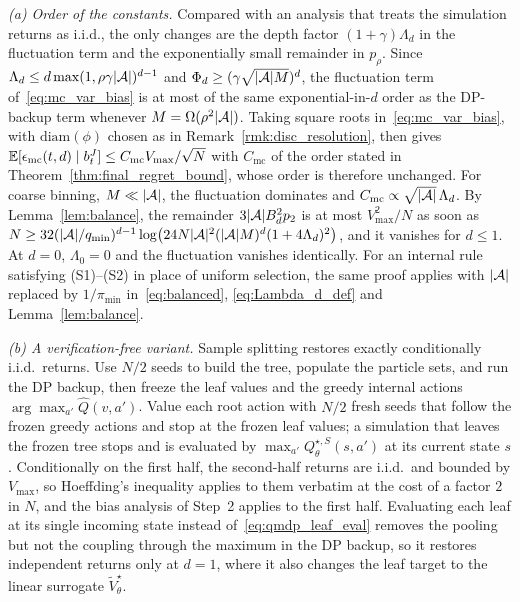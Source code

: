 \begin{rmk}\label{rmk:mc_constants}
\emph{(a) Order of the constants.}
Compared with an analysis that treats the simulation returns as i.i.d., the only changes are the depth factor $(1+\gamma)\Lambda_d$ in the fluctuation term and the exponentially small remainder in $p_\rho$.
Since $\Lambda_d\le d\max(1,\rho\gamma|{\mathcal{A}}|)^{d-1}$ and $\Phi_d\ge(\gamma\sqrt{|{\mathcal{A}}|M})^d$, the fluctuation term of~\eqref{eq:mc_var_bias} is at most of the same exponential-in-$d$ order as the DP-backup term whenever $M=\Omega(\rho^2|{\mathcal{A}}|)$.
Taking square roots in~\eqref{eq:mc_var_bias}, with $\mathrm{diam}(\phi)$ chosen as in Remark~\ref{rmk:disc_resolution}, then gives $\mathbb{E}[\epsilon_{\mathrm{mc}}(t,d)\mid b_t^J]\le C_{\mathrm{mc}}V_{\max}/\sqrt N$ with $C_{\mathrm{mc}}$ of the order stated in Theorem~\ref{thm:final_regret_bound}, whose order is therefore unchanged.
For coarse binning, $M\ll|{\mathcal{A}}|$, the fluctuation dominates and $C_{\mathrm{mc}}\propto\sqrt{|{\mathcal{A}}|}\,\Lambda_d$.
By Lemma~\ref{lem:balance}, the remainder $3|{\mathcal{A}}|B_d^2p_2$ is at most $V_{\max}^2/N$ as soon as $N\ge32(|{\mathcal{A}}|/q_{\min})^{d-1}\log\bigl(24N|{\mathcal{A}}|^2(|{\mathcal{A}}|M)^d(1+4\Lambda_d)^2\bigr)$, and it vanishes for $d\le1$.
At $d=0$, $\Lambda_0=0$ and the fluctuation vanishes identically.
For an internal rule satisfying (S1)--(S2) in place of uniform selection, the same proof applies with $|{\mathcal{A}}|$ replaced by $1/\pi_{\min}$ in~\eqref{eq:balanced}, \eqref{eq:Lambda_d_def} and Lemma~\ref{lem:balance}.

\emph{(b) A verification-free variant.}
Sample splitting restores exactly conditionally i.i.d.\ returns.
Use $N/2$ seeds to build the tree, populate the particle sets, and run the DP backup, then freeze the leaf values and the greedy internal actions $\arg\max_{a'}\hat Q(v,a')$.
Value each root action with $N/2$ fresh seeds that follow the frozen greedy actions and stop at the frozen leaf values; a simulation that leaves the frozen tree stops and is evaluated by $\max_{a'}Q_\theta^{\star,S}(s,a')$ at its current state $s$.
Conditionally on the first half, the second-half returns are i.i.d.\ and bounded by $V_{\max}$, so Hoeffding's inequality applies to them verbatim at the cost of a factor $2$ in $N$, and the bias analysis of Step~2 applies to the first half.
Evaluating each leaf at its single incoming state instead of~\eqref{eq:qmdp_leaf_eval} removes the pooling but not the coupling through the maximum in the DP backup, so it restores independent returns only at $d=1$, where it also changes the leaf target to the linear surrogate $\widetilde V_\theta^{\star}$.


\end{rmk}
